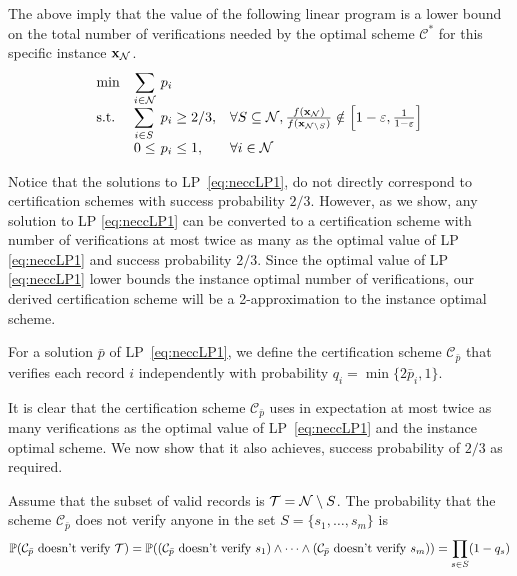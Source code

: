 \noindent The above imply that the value of the following linear program is a lower bound on the total number of verifications
needed by the optimal scheme $\mathcal{C}^*$ for this specific instance $\mathbf{x}_{\mathcal{N}}$.
  \begin{equation}
    \label{eq:neccLP1}
    \begin{array}{ll@{}ll}
      \min  & \displaystyle\sum\limits_{i \in \Workers} & ~p_i & \\
      \text{s.t.} & \displaystyle\sum\limits_{i \in S} & ~p_i \ge 2/3, & \forall S \subseteq \Workers, \frac{f(\xw)}{f(\vec{x}_{\Workers\setminus S})} \notin \left[ 1 - \eps, \frac{1}{1 - \eps} \right] \\
                  & 0 \le & ~p_i \le 1, & \forall i \in \Workers
    \end{array}
  \end{equation}

  \noindent Notice that the solutions to LP~\eqref{eq:neccLP1}, do not directly correspond to certification schemes with success
probability $2/3$. However, as we show, any solution to LP \eqref{eq:neccLP1} can be converted to a certification scheme with
number of verifications at most twice as many as the optimal value of LP \eqref{eq:neccLP1} and success probability $2/3$. Since
the optimal value of LP \eqref{eq:neccLP1} lower bounds the instance optimal number of verifications, our derived certification
scheme will be a 2-approximation to the instance optimal scheme.

\begin{definition}
    For a solution $\bar{p}$ of LP~\eqref{eq:neccLP1}, we define the certification scheme $\mathcal{C}_{\bar{p}}$ that verifies
  each record $i$ independently with probability $q_i=\min\{2\bar{p}_i,1\}$.
\end{definition}

  It is clear that the certification scheme $\mathcal{C}_{\bar{p}}$ uses in expectation at most twice as many verifications as
the optimal value of LP~\eqref{eq:neccLP1} and the instance optimal scheme. We now show that it also achieves, success probability
of $2/3$ as required.
\medskip

\noindent Assume that the subset of valid records is $\mathcal{T} = \mathcal{N} \setminus S$. The probability that the scheme
$\mathcal{C}_{\bar{p}}$ does not verify anyone in the set $S = \{s_1, \dots, s_m\}$ is
\[ \mathbb{P}(\text{$\mathcal{C}_{\bar{p}}$ doesn't verify $\mathcal{T}$}) = \mathbb{P}( (\text{$\mathcal{C}_{\bar{p}}$ doesn't verify $s_1$}) \wedge \dots \wedge (\text{$\mathcal{C}_{\bar{p}}$ doesn't verify $s_m$})) =\prod_{s \in S} (1 - q_s) \]

